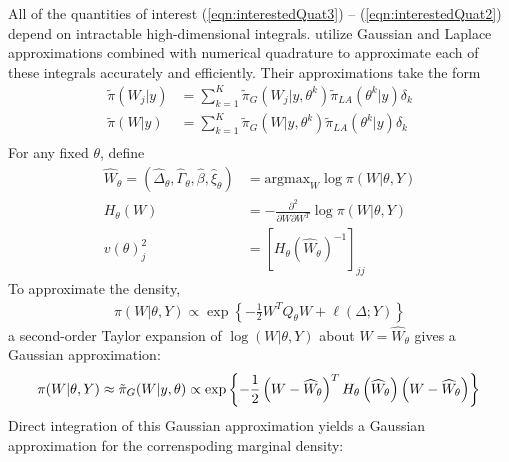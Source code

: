 \documentclass[]{article}
\begin{document}
All of the quantities of interest (\ref{eqn:interestedQuat3}) -- (\ref{eqn:interestedQuat2}) depend on intractable high-dimensional integrals. \citet{casecross} utilize Gaussian and Laplace approximations combined with numerical quadrature to approximate each of these integrals accurately and efficiently. Their approximations take the form
\begin{equation}\begin{aligned}\label{eqn:integration}
\tilde{\pi}(W_{j}|y) &= \sum_{k=1}^{K}
\tilde{\pi}_{G}(W_{j}|y,\theta^{k})
\tilde{\pi}_{LA}(\theta^{k}|y)\delta_{k} \\
\tilde{\pi}(W|y) &= \sum_{k=1}^{K}
\tilde{\pi}_{G}(W|y,\theta^{k})
\tilde{\pi}_{LA}(\theta^{k}|y)\delta_{k} \\
\end{aligned}\end{equation}
For any fixed $\theta$, define
\begin{equation}\begin{aligned}\label{eqn:modeandhessian}
\widehat{W}_{\theta} = \left( \widehat{\Delta}_{\theta},\widehat{\Gamma}_{\theta},\widehat{\beta},\widehat{\xi}_{\theta}\right) &= \text{argmax}_{W}\log\pi(W|\theta,Y) \\ 
H_{\theta}(W) &= -\frac{\partial^{2}}{\partial W \partial W^{T}}\log\pi(W|\theta,Y) \\
v(\theta)_j^2 &= \left[H_\theta \left(\widehat{W}_{\theta}\right) ^ {-1} \right]_{jj}
\end{aligned}\end{equation}
To approximate the density,
\begin{equation}\begin{aligned}\label{eqn:condpost}
\pi(W|\theta,Y) \propto \exp\left\lbrace -\frac{1}{2}W^{T}Q_{\theta}W + \ell\left(\Delta;Y\right)\right\rbrace
\end{aligned}\end{equation}
a second-order Taylor expansion of $\log(W|\theta,Y)$ about $W = \widehat{W}_{\theta}$ gives a Gaussian approximation:
\begin{equation}\label{eqn:gaussianapprox}
\pi(W|\theta,Y) \approx \tilde{\pi}_{G}(W|y,\theta) \propto \text{exp}\left\{-\frac{1}{2} \left(W-\widehat{W}_{\theta} \right)^T H_\theta\left(\widehat{W}_{\theta}\right) \left(W-\widehat{W}_{\theta} \right) \right\} \\
\end{equation}
Direct integration of this Gaussian approximation yields a Gaussian approximation for the correnspoding marginal density:
\end{document}
